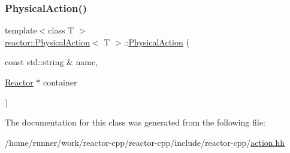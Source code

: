 \subsubsection{\texorpdfstring{Physical\+Action()}{PhysicalAction()}}
{\footnotesize\ttfamily template$<$class T $>$ \\
\hyperlink{classreactor_1_1PhysicalAction}{reactor\+::\+Physical\+Action}$<$ T $>$\+::\hyperlink{classreactor_1_1PhysicalAction}{Physical\+Action} (\begin{DoxyParamCaption}\item[{const std\+::string \&}]{name,  }\item[{\hyperlink{classreactor_1_1Reactor}{Reactor} $\ast$}]{container }\end{DoxyParamCaption})\hspace{0.3cm}{\ttfamily [inline]}}



The documentation for this class was generated from the following file\+:\begin{DoxyCompactItemize}
\item 
/home/runner/work/reactor-\/cpp/reactor-\/cpp/include/reactor-\/cpp/\hyperlink{action_8hh}{action.\+hh}\end{DoxyCompactItemize}
